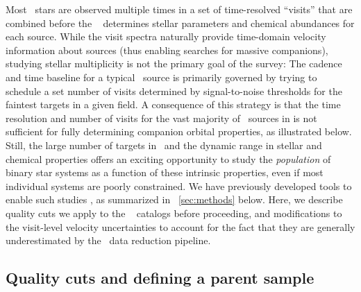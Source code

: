 \documentclass[modern]{aastex63}
\begin{document}
Most \apogee\ stars are observed multiple times in a set of time-resolved
``visits'' that are combined before the \apogee\  determines
stellar parameters and chemical abundances for each source.
While the visit spectra naturally provide time-domain velocity information about
sources (thus enabling searches for massive companions), studying stellar
multiplicity is not the primary goal of the survey:
The cadence and time baseline for a typical \apogee\ source is primarily
governed by trying to schedule a set number of visits determined by
signal-to-noise thresholds for the faintest targets in a given field.
A consequence of this strategy is that the time resolution and number of visits
for the vast majority of \apogee\ sources in  is not sufficient for fully
determining companion orbital properties, as illustrated below.
Still, the large number of targets in \apogee\ and the dynamic range in stellar
and chemical properties offers an exciting opportunity to study the
\emph{population} of binary star systems as a function of these intrinsic
properties, even if most individual systems are poorly constrained.
We have previously developed tools to enable such studies \citep{thejoker}, as
summarized in \sectionname~\ref{sec:methods} below.
Here, we describe quality cuts we apply to the \apogee\  catalogs before
proceeding, and modifications to the visit-level velocity uncertainties to
account for the fact that they are generally underestimated by the \apogee\ data
reduction pipeline.


\subsection{Quality cuts and defining a parent sample}
\end{document}
